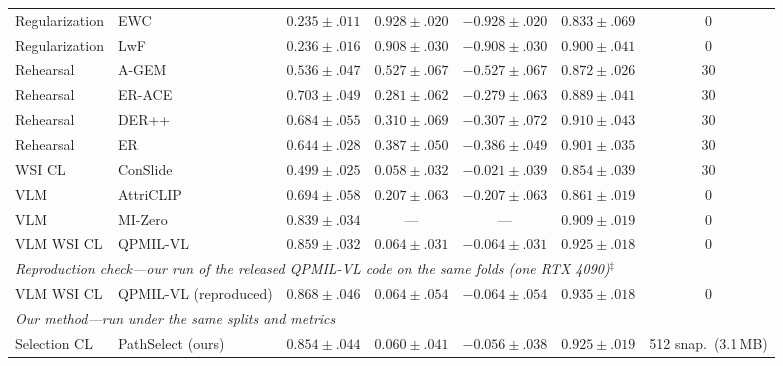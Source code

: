 \documentclass{article}
\begin{document}
\begin{table}[t]
\begin{tabular}{llccccc}
Regularization & EWC \cite{kirkpatrick2017ewc} & $0.235{\pm}.011$ & $0.928{\pm}.020$ & $-0.928{\pm}.020$ & $0.833{\pm}.069$ & 0 \\
Regularization & LwF \cite{li2017lwf} & $0.236{\pm}.016$ & $0.908{\pm}.030$ & $-0.908{\pm}.030$ & $0.900{\pm}.041$ & 0 \\
Rehearsal & A-GEM \cite{chaudhry2019agem} & $0.536{\pm}.047$ & $0.527{\pm}.067$ & $-0.527{\pm}.067$ & $0.872{\pm}.026$ & 30 \\
Rehearsal & ER-ACE \cite{caccia2022erace} & $0.703{\pm}.049$ & $0.281{\pm}.062$ & $-0.279{\pm}.063$ & $0.889{\pm}.041$ & 30 \\
Rehearsal & DER++ \cite{buzzega2020derpp} & $0.684{\pm}.055$ & $0.310{\pm}.069$ & $-0.307{\pm}.072$ & $0.910{\pm}.043$ & 30 \\
Rehearsal & ER \cite{chaudhry2019er} & $0.644{\pm}.028$ & $0.387{\pm}.050$ & $-0.386{\pm}.049$ & $0.901{\pm}.035$ & 30 \\
WSI CL & ConSlide \cite{huang2023conslide} & $0.499{\pm}.025$ & $0.058{\pm}.032$ & $-0.021{\pm}.039$ & $0.854{\pm}.039$ & 30 \\
VLM & AttriCLIP \cite{wang2023attriclip} & $0.694{\pm}.058$ & $0.207{\pm}.063$ & $-0.207{\pm}.063$ & $0.861{\pm}.019$ & 0 \\
VLM & MI-Zero \cite{lu2023mizero} & $0.839{\pm}.034$ & --- & --- & $0.909{\pm}.019$ & 0 \\
VLM WSI CL & QPMIL-VL \cite{gou2025qpmil} & $0.859{\pm}.032$ & $0.064{\pm}.031$ & $-0.064{\pm}.031$ & $0.925{\pm}.018$ & 0 \\
\midrule
\multicolumn{7}{l}{\emph{Reproduction check---our run of the released QPMIL-VL code on the same folds (one RTX 4090)$^\ddagger$}} \\
VLM WSI CL & QPMIL-VL (reproduced) & $0.868{\pm}.046$ & $0.064{\pm}.054$ & $-0.064{\pm}.054$ & $0.935{\pm}.018$ & 0 \\
\midrule
\multicolumn{7}{l}{\emph{Our method---run under the same splits and metrics}} \\
Selection CL & PathSelect (ours) & $0.854{\pm}.044$ & $0.060{\pm}.041$ & $-0.056{\pm}.038$ & $0.925{\pm}.019$ & 512 snap.\ (3.1\,MB) \\
\bottomrule
\end{tabular}
\end{table}
\end{document}
